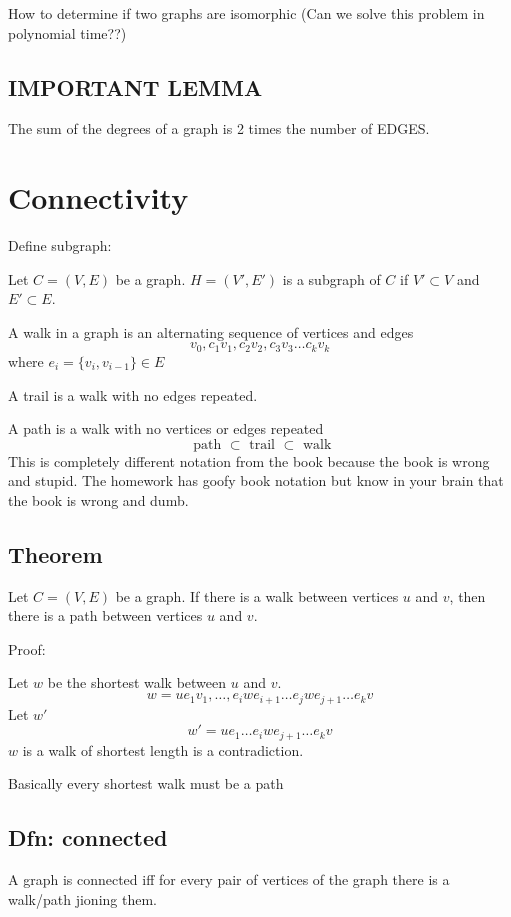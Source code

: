 \documentclass{report}
\begin{document}
How to determine if two graphs are isomorphic (Can we solve this problem in polynomial time??)



\section{IMPORTANT LEMMA}
The sum of the degrees of a graph is 2 times the number of EDGES.


\chapter{Connectivity}
Define subgraph:

Let $C = (V, E)$ be a graph. $H = (V', E')$ is a subgraph of $C$ if $V' \subset V$ and $E' \subset E$.
\newline

A walk in a graph is an alternating sequence of vertices and edges
\[
v_0, c_1 v_1, c_2 v_2, c_3 v_3 \ldots c_k v_k
\]
where $e_i = \{ v_i, v_{i - 1} \} \in E$

A trail is a walk with no edges repeated.

A path is a walk with no vertices or edges repeated
\[
\textrm{ path } \subset \textrm{ trail } \subset \textrm{ walk}
\]
This is completely different notation from the book because the book is wrong and stupid. The homework has goofy book notation but know in your brain that the book is wrong and dumb.

\section{Theorem}
Let $C = (V, E)$ be a graph. If there is a walk between vertices $u$ and $v$, then there is a path between vertices $u$ and $v$.

Proof:

Let $w$ be the shortest walk between $u$ and $v$.
\[
w = u e_1 v_1, \ldots, e_i w e_{i + 1} \ldots e_j w e_{j + 1} \ldots e_k v
\]
Let $w'$ 
\[
w' = u e_1 \ldots e_i w e_{j + 1} \ldots e_k v
\]
$w$ is a walk of shortest length is a contradiction.

Basically every shortest walk must be a path

\section{Dfn: connected}
A graph is connected iff for every pair of vertices of the graph there is a walk/path jioning them. 
\end{document}
